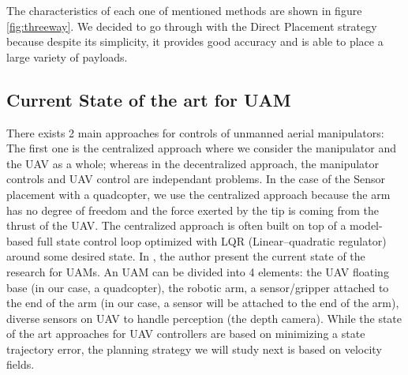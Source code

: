 The characteristics of each one of mentioned methods are shown in figure \ref{fig:threeway}.
We decided to go through with the Direct Placement strategy because despite its simplicity, it provides good accuracy and is able to place a large variety of payloads.\\

\subsection{Current State of the art for UAM}
There exists 2 main approaches for controls of unmanned aerial manipulators: The first one is the centralized approach where we consider the manipulator and the UAV as a whole; whereas in the decentralized approach, the manipulator controls and UAV control are independant problems.
In the case of the Sensor placement with a quadcopter, we use the centralized approach because the arm has no degree of freedom and the force exerted by the tip is coming from the thrust of the UAV.
The centralized approach is often built on top of a model-based full state control loop optimized with LQR (Linear–quadratic regulator) around some desired state. 
In \cite{ruggiero2018aerial}, the author present the current state of the research for UAMs.
An UAM can be divided into 4 elements: the UAV floating base (in our case, a quadcopter), the robotic arm, a sensor/gripper attached to the end of the arm (in our case, a sensor will be attached to the end of the arm), diverse sensors on UAV to handle perception (the depth camera).
While the state of the art approaches for UAV controllers are based on minimizing a state trajectory error, the planning strategy we will study next is based on velocity fields.
